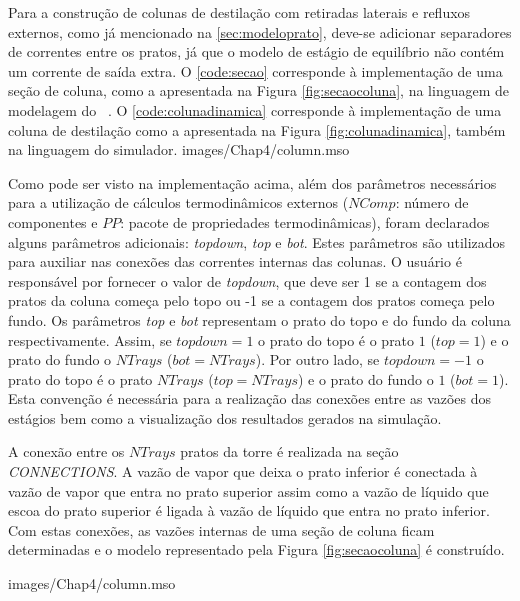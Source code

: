 Para a construção de colunas de destilação com retiradas laterais e refluxos externos, como já mencionado
na \autoref{sec:modeloprato}, deve-se adicionar separadores de correntes entre os pratos, já que o modelo de
estágio de equilíbrio não contém um corrente de saída extra.
O \autoref{code:secao} corresponde à implementação de uma seção de coluna, como a apresentada na Figura
\autoref{fig:secaocoluna}, na linguagem de modelagem do \emso\ . O \autoref{code:colunadinamica} corresponde à
implementação de uma coluna de
destilação como a apresentada na Figura \autoref{fig:colunadinamica}, também
na linguagem do simulador.
 {images/Chap4/column.mso}

Como pode ser visto na implementação acima, além dos parâmetros necessários para a utilização de cálculos
termodinâmicos externos ($NComp$: número de componentes e $PP$: pacote de propriedades termodinâmicas),
foram declarados alguns parâmetros adicionais: \textit{topdown}, \textit{top} e \textit{bot}.
Estes parâmetros são utilizados para auxiliar nas conexões das correntes internas das colunas. O usuário é responsável
por fornecer o valor de \textit{topdown}, que deve ser 1 se a contagem dos pratos da coluna começa pelo topo
ou -1 se a contagem dos pratos começa pelo fundo. Os parâmetros \textit{top} e \textit{bot} representam
o prato do topo e do fundo da coluna respectivamente. Assim, se $topdown = 1$ o prato do topo é o prato $1$ ($top=1$)
e o prato do fundo o $NTrays$  ($bot = NTrays$). Por outro lado, se $topdown = -1$ o prato do topo
é o prato $NTrays$ ($top=NTrays$) e o prato do fundo o $1$ ($bot = 1$). Esta convenção é necessária para
a realização das conexões entre as vazões dos estágios bem como a visualização dos resultados gerados na simulação.

A conexão entre os $NTrays$ pratos da torre é realizada na seção \textit{CONNECTIONS}. A vazão de vapor que
deixa o prato inferior é conectada à vazão de vapor que entra no prato superior assim como a vazão de líquido
que escoa do prato superior é ligada à vazão de líquido que entra no prato inferior. Com estas conexões, as vazões
internas de uma seção de coluna ficam determinadas e o modelo representado pela Figura \autoref{fig:secaocoluna} é
construído.

 {images/Chap4/column.mso}

